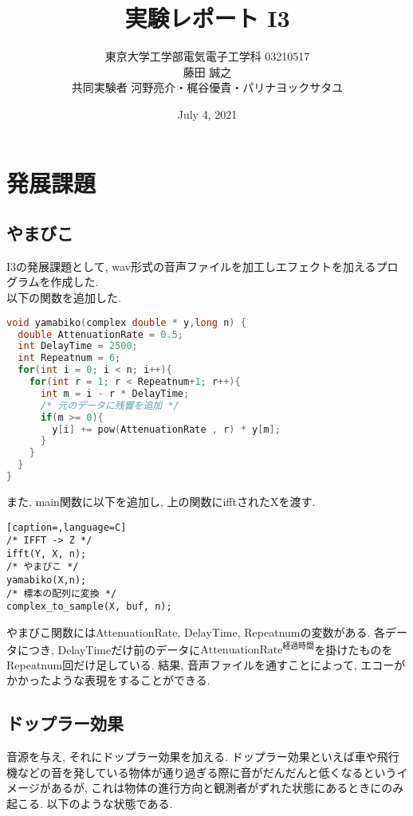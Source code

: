 \documentclass{ltjsarticle}
\title{実験レポート I3}
\author{東京大学工学部電気電子工学科 03210517 \\ 藤田 誠之 \\共同実験者  河野亮介・梶谷優貴・パリナヨックサタユ}
\date{July 4, 2021}
\begin{document}
\maketitle

\section{発展課題}
\subsection{やまびこ}
I3の発展課題として, wav形式の音声ファイルを加工しエフェクトを加えるプログラムを作成した. \\
以下の関数を追加した. 
\begin{lstlisting}[caption=やまびこ,language=C]
void yamabiko(complex double * y,long n) {
  double AttenuationRate = 0.5;
  int DelayTime = 2500;
  int Repeatnum = 6;
  for(int i = 0; i < n; i++){
    for(int r = 1; r < Repeatnum+1; r++){
      int m = i - r * DelayTime;
      /* 元のデータに残響を追加 */
      if(m >= 0){
        y[i] += pow(AttenuationRate , r) * y[m];
      }
    }
  }
}
\end{lstlisting}
また, main関数に以下を追加し, 上の関数にifftされたXを渡す.
\begin{lstlisting}[caption=,language=C]
/* IFFT -> Z */
ifft(Y, X, n);
/* やまびこ */
yamabiko(X,n);
/* 標本の配列に変換 */
complex_to_sample(X, buf, n);
\end{lstlisting}
やまびこ関数にはAttenuationRate, DelayTime, Repeatnumの変数がある. 各データにつき, DelayTimeだけ前のデータに$\mbox{AttenuationRate}^{経過時間}$を掛けたものをRepeatnum回だけ足している. 結果, 音声ファイルを通すことによって, エコーがかかったような表現をすることができる. 

\subsection{ドップラー効果}
音源を与え, それにドップラー効果を加える. ドップラー効果といえば車や飛行機などの音を発している物体が通り過ぎる際に音がだんだんと低くなるというイメージがあるが, これは物体の進行方向と観測者がずれた状態にあるときにのみ起こる. 以下のような状態である. 
\end{document}
